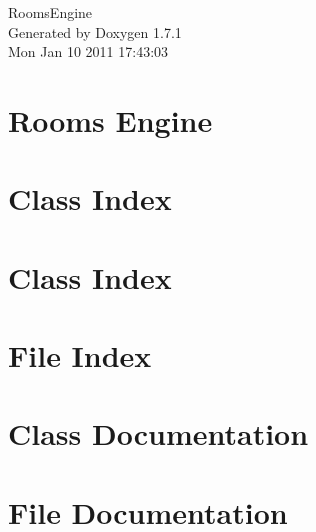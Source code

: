 \documentclass[a4paper]{book}
\begin{document}
\hypersetup{pageanchor=false}
\begin{titlepage}
\vspace*{7cm}
\begin{center}
{\Large RoomsEngine }\\
\vspace*{1cm}
{\large Generated by Doxygen 1.7.1}\\
\vspace*{0.5cm}
{\small Mon Jan 10 2011 17:43:03}\\
\end{center}
\end{titlepage}
\clearemptydoublepage
{}
\tableofcontents
\clearemptydoublepage
{}
\hypersetup{pageanchor=true}
\chapter{Rooms Engine}
\label{index}\hypertarget{index}{}
\chapter{Class Index}

\chapter{Class Index}

\chapter{File Index}

\chapter{Class Documentation}













\chapter{File Documentation}











\printindex
\end{document}
